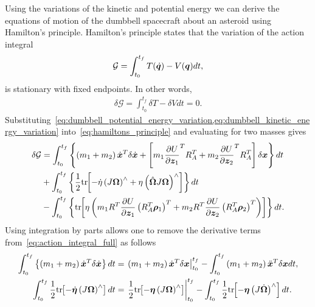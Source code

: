 Using the variations of the kinetic and potential energy we can derive the equations of motion of the dumbbell spacecraft about an asteroid using Hamilton's principle. 
Hamilton's principle states that the variation of the action integral
\begin{align}\label{eq:action_integral}
    \mathcal{G} = \int_{t_0}^{t_f} T(\dot{\bm{q}}) - V(\bm{q}) dt,
\end{align}
is stationary with fixed endpoints. 
In other words, 
\begin{align}\label{eq:hamiltons_principle}
    \delta \mathcal{G}  = \int_{t_0}^{t_f} \delta T - \delta V dt = 0.
\end{align}
Substituting~\cref{eq:dumbbell_potential_energy_variation,eq:dumbbell_kinetic_energy_variation} into~\cref{eq:hamiltons_principle} and evaluating for two masses gives
\begin{align}\label{eq:action_integral_full}
    \delta \mathcal{G} &= \int_{t_0}^{t_f} \left\{  \left( m_1 + m_2  \right)\dot{\bm{x}}^T \delta \dot{\bm{x}}  + \left[ m_1 \frac{\partial U}{\partial \bm{z}_1}^T R_A^T + m_2 \frac{\partial U}{\partial \bm{z}_2}^T R_A^T  \right] \delta \bm{x} \right\} dt \nonumber\\
                        &+ \int_{t_0}^{t_f} \left\{ \frac{1}{2} \mathrm{tr}\negthickspace\left[ -\dot{\eta} \left( J \bm{\Omega} \right)^\wedge + \eta \left( \hat{\bm{\Omega}}J\bm{\Omega}  \right)^\wedge  \right]  \right\} dt  \nonumber\\
                        &- \int_{t_0}^{t_f} \left\{ \mathrm{tr}\negthickspace\left[  \eta \left( m_1 R^T \frac{\partial U}{\partial \bm{z}_1} \left( R_A^T \bm{\rho}_1 \right)^T + m_2 R^T \frac{\partial U}{\partial \bm{z}_2} \left( R_A^T \bm{\rho}_2 \right)^T \right) \right]  \right\} dt.
\end{align}
Using integration by parts allows one to remove the derivative terms from~\cref{eq:action_integral_full} as follows
\begin{subequations}\label{eq:action_integral_integration_by_parts}
    \begin{align}
        \int_{t_0}^{t_f} \left\{  \left( m_1 + m_2  \right) \dot{\bm{x}}^T \delta \dot{\bm{x}}  \right\} dt  &= \left. \left( m_1 + m_2 \right) \dot{\bm{x}}^T \delta \bm{x} \right|_{t_0}^{t_f} - \int_{t_0}^{t_f} \left( m_1 + m_2 \right) \ddot{\bm{x}}^T \delta \bm{x} dt, \label{eq:action_integral_integration_by_parts_translation}\\
            \int_{t_0}^{t_f} \frac{1}{2} \mathrm{tr}\negthickspace\left[  - \dot{\bm{\eta}} \left( J \bm{\Omega} \right)^\wedge  \right] dt &= \left. \frac{1}{2} \mathrm{tr}\negthickspace\left[  - \bm{\eta} \left( J \bm{\Omega} \right)^\wedge  \right] \right|_{t_0}^{t_f} - \int_{t_0}^{t_f} \frac{1}{2} \mathrm{tr}\negthickspace\left[ - \bm{\eta} \left( J \dot{\bm{\Omega}}  \right)^\wedge  \right] dt. \label{eq:action_integral_integration_by_parts_attitude}
    \end{align}
\end{subequations}     
